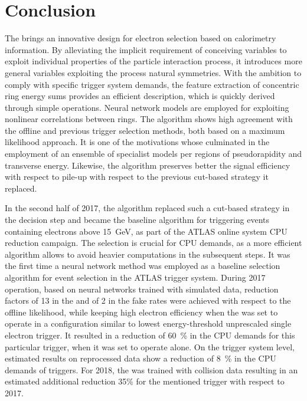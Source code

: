 \chapter{Conclusion}\label{sec:conclusion}


The \rnn{} brings an innovative design for electron selection based on
calorimetry information. By alleviating the implicit requirement of conceiving
variables to exploit individual properties of the particle interaction process, it introduces 
more general variables exploiting the process natural symmetries. With the
ambition to comply with specific trigger system demands, the feature extraction
of concentric ring energy sums provides an efficient description, which is quickly derived
through simple operations. Neural network models are employed for exploiting
nonlinear correlations between rings. The algorithm shows
high agreement with the offline and previous trigger selection methods, both based
on a maximum likelihood approach. It is one of the motivations whose culminated
in the employment of an ensemble of specialist models per regions of
pseudorapidity and transverse energy. Likewise, the \rnn{} algorithm preserves
better the signal efficiency with respect to pile-up with respect to the
previous cut-based strategy it replaced.


In the second half of 2017, the \rnn{} algorithm replaced such a cut-based strategy
in the \fastcalo{} decision step and became the baseline algorithm
for triggering events containing electrons above \SI{15}{\GeV}, as part of the ATLAS online system CPU reduction campaign. The \fastcalo{} selection is crucial for CPU demands, as a more
efficient algorithm allows to avoid heavier computations in the
subsequent steps.  It was the first time a neural network method was employed as
a baseline selection algorithm for event selection in the ATLAS trigger system.
During 2017 operation, based on neural networks trained with simulated data,
reduction factors of 13 in the \fastcalo{} and of 2 in
the \hlt{} fake rates were achieved with respect to the offline likelihood, while
keeping high electron efficiency when the \rnn{} was set to operate in a
configuration similar to lowest energy-threshold unprescaled single electron
trigger. It resulted in a reduction of \SI{60}{\%} in the CPU demands for this particular trigger, when it was set to operate alone. On the trigger system level,
estimated results on reprocessed data show a reduction of \SI{8}{\%} in the CPU
demands of \egamma{} triggers. For 2018, the \rnn{} was trained with collision
data resulting in an estimated additional reduction 35\% for the
mentioned trigger with respect to 2017.

